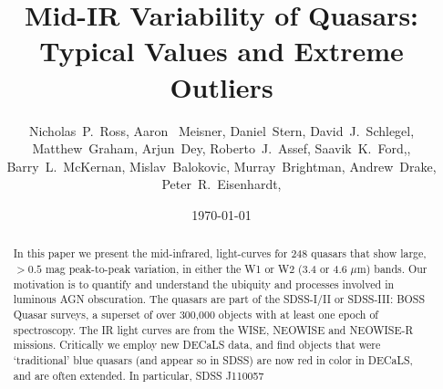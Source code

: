 \documentclass{emulateapj}
\begin{document}

\title{Mid-IR Variability of Quasars:  \\
       Typical Values and Extreme Outliers
}
\author{
Nicholas~P.~Ross, 
Aaron~ Meisner, 
Daniel~Stern,
David~J.~Schlegel,
Matthew~Graham, 
Arjun~Dey,
Roberto~J.~Assef,
Saavik~K.~Ford,, 
Barry~L.~McKernan,
Mislav~Balokovic, 
Murray~Brightman, 
Andrew~Drake, 
Peter~R.~Eisenhardt, 
}


\date{\today}

\begin{abstract}
In this paper we present the mid-infrared, light-curves for 248 quasars that show large, $>0.5$ mag peak-to-peak variation, 
in either the W1 or W2 (3.4 or 4.6 $\mu$m) bands. Our motivation is to quantify and understand the ubiquity and 
processes involved in luminous AGN obscuration. 
The quasars are part of the SDSS-I/II or SDSS-III: BOSS Quasar surveys, a superset of over 300,000 
objects with at least one epoch of spectroscopy. The IR light curves are from the WISE, NEOWISE and NEOWISE-R
missions. 
Critically we employ new DECaLS data, and find objects that were `traditional' blue quasars (and appear so in SDSS) 
are now red in color in DECaLS, and are often extended. 
In particular, SDSS J110057
\end{abstract}

\end{document}
